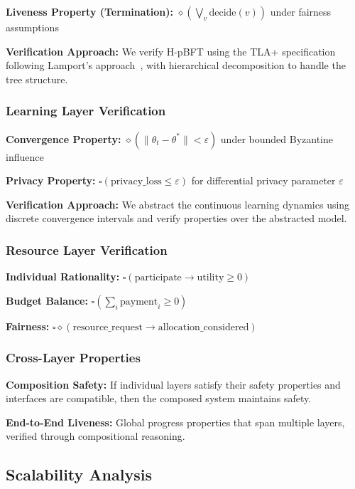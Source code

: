 \documentclass[conference]{IEEEtran}
\newcommand{\epsilon}{\varepsilon}
\begin{document}
\textbf{Liveness Property (Termination):} $\diamond(\bigvee_v \text{decide}(v))$ under fairness assumptions

\textbf{Verification Approach:} We verify H-pBFT using the TLA+ specification following Lamport's approach~\cite{lamport2002specifying}, with hierarchical decomposition to handle the tree structure.

\subsubsection{Learning Layer Verification}

\textbf{Convergence Property:} $\diamond(\|\theta_t - \theta^*\| < \epsilon)$ under bounded Byzantine influence

\textbf{Privacy Property:} $\square(\text{privacy\_loss} \leq \epsilon)$ for differential privacy parameter $\epsilon$

\textbf{Verification Approach:} We abstract the continuous learning dynamics using discrete convergence intervals and verify properties over the abstracted model.

\subsubsection{Resource Layer Verification}

\textbf{Individual Rationality:} $\square(\text{participate} \rightarrow \text{utility} \geq 0)$

\textbf{Budget Balance:} $\square(\sum_i \text{payment}_i \geq 0)$

\textbf{Fairness:} $\square \diamond(\text{resource\_request} \rightarrow \text{allocation\_considered})$

\subsubsection{Cross-Layer Properties}

\textbf{Composition Safety:} If individual layers satisfy their safety properties and interfaces are compatible, then the composed system maintains safety.

\textbf{End-to-End Liveness:} Global progress properties that span multiple layers, verified through compositional reasoning.

\subsection{Scalability Analysis}
\end{document}
